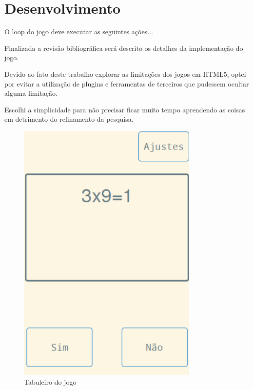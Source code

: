 \documentclass[
12pt,
a4paper,
portuges,
draft
]{report}
\begin{document}
\section{Desenvolvimento}

O loop do jogo deve executar as seguintes ações...

Finalizada a revisão bibliográfica será descrito os detalhes da implementação do jogo.

Devido ao fato deste trabalho explorar as limitações dos jogos em
HTML5, optei por evitar a utilização de plugins e ferramentas de
terceiros que pudessem ocultar alguma limitação.

Escolhi a simplicidade para não precisar ficar muito tempo aprendendo
as coisas em detrimento do refinamento da pesquisa.

\begin{figure}
    \centering
    \includegraphics[width=0.8\textwidth,natwidth=610,natheight=642]{board.png}
	\caption{Tabuleiro do jogo}
\end{figure}
\end{document}
